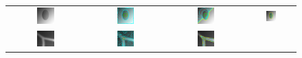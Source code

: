 \begin{figure}[th]
\begin{tabular}{@{}cccc@{}}
\\
\includegraphics[width=0.24\textwidth]{images/L2S_compare/orig_3}	&
\includegraphics[width=0.24\textwidth]{images/L2S_compare/GAC_3}	&
\includegraphics[width=0.24\textwidth]{images/L2S_compare/CV_3}		&
\includegraphics[width=0.24\textwidth]{images/L2S_compare/L2S_3}	
\\
\includegraphics[width=0.24\textwidth]{images/L2S_compare/orig_1}	&
\includegraphics[width=0.24\textwidth]{images/L2S_compare/GAC_1}	&
\includegraphics[width=0.24\textwidth]{images/L2S_compare/CV_1}		&

\end{tabular}
\end{figure}
